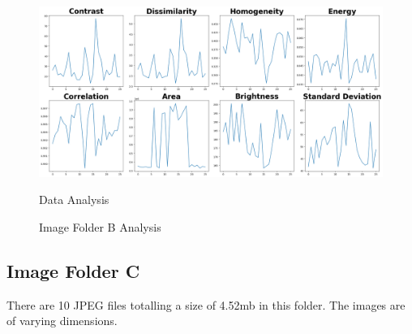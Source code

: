 \begin{figure}[ht]
\begin{minipage}[t]{0.50\textwidth}
        \centering
        \includegraphics[width=\textwidth]{Figures/EDA_Charts/3/da.png}
        \caption*{Data Analysis}
    \end{minipage}
    \caption{Image Folder B Analysis}
    \label{fig:Image Folder B Analysis}
\end{figure}

\newpage

\subsection{Image Folder C}


There are 10 JPEG files totalling a size of 4.52mb in this folder. The images are of varying dimensions.

